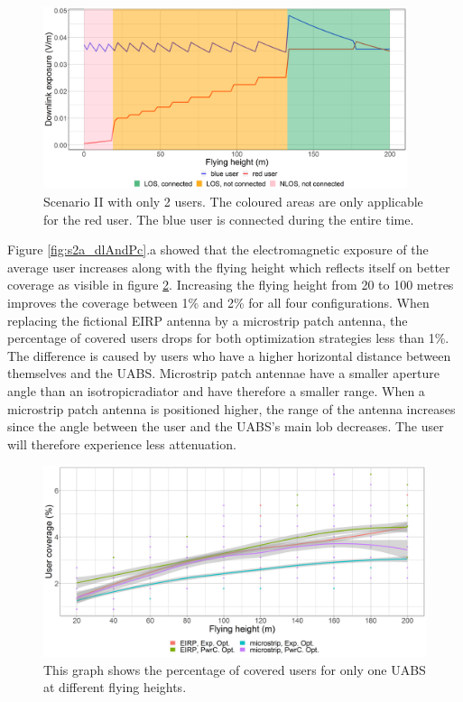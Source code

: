 \begin{figure}[h!]
\centering
  \includegraphics[width=0.95\textwidth]{../results/s2/prove.png}
  \caption{Scenario II with only 2 users. The coloured areas are only applicable for the red user. 
  The blue user is connected during the entire time.}
  \label{fig:prove}
\end{figure}

\FloatBarrier
Figure \ref{fig:s2a_dlAndPc}.a showed that the electromagnetic exposure of the average user increases along with the flying height
which reflects itself on better coverage as visible in figure  \ref{fig:s2fhvscov}.
Increasing the flying height from 20 to 100 metres improves the coverage between 1\% and 2\% for all four configurations.
When replacing the fictional \gls{EIRP} antenna by a microstrip patch antenna, the percentage of covered users drops for both 
optimization strategies less than 1\%. 
The difference is caused by users who have a higher horizontal distance between themselves and the \gls{UABS}. Microstrip 
patch antennae have a smaller aperture angle than an \gls{isotropicradiator} and have therefore a smaller range.
When a microstrip patch antenna is positioned higher, the range of the antenna increases 
since the angle between the user and the \gls{UABS}'s main lob decreases. The user will therefore experience less attenuation.

\begin{figure}[h!]
  \includegraphics[width=\textwidth]{../results/s2/fhvscov.png}
  \caption{This graph shows the percentage of covered users for only one \acs{UABS} at different flying heights.}
  \label{fig:s2fhvscov}
\end{figure}

